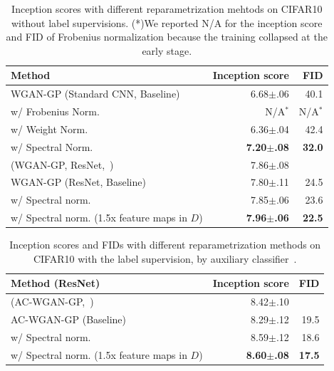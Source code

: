 \documentclass{article}
\begin{document}
\begin{table}
  \centering
  \begin{tabular}{lrr}
    \toprule
    \textbf{Method} & \textbf{Inception score} & \textbf{FID}\\
    \midrule
    WGAN-GP (Standard CNN, Baseline) & 6.68$\pm$.06 & 40.1  \\
    w/ Frobenius Norm. & N/A$^*$ & N/A$^*$ \\
    w/ Weight Norm. & 6.36$\pm$.04 & 42.4 \\
    w/ Spectral Norm. & \bf{7.20$\pm$.08} & \bf{32.0} \\
    \midrule
    (WGAN-GP, ResNet,~\cite{gulrajani2017improved}) & 7.86$\pm$.08\\
    WGAN-GP (ResNet, Baseline) & 7.80$\pm$.11 & 24.5 \\
    w/ Spectral norm. & 7.85$\pm$.06 & 23.6\\
    w/ Spectral norm. (1.5x feature maps in $D$) & \bf{7.96$\pm$.06} & \textbf{22.5} \\
    \bottomrule
  \end{tabular}
  \caption{\label{tab:wgan_gp_reparam1} Inception scores with different reparametrization mehtods on CIFAR10 without label supervisions. (*)We reported N/A for the inception score and FID of Frobenius normalization because the training collapsed at the early stage. }
\end{table}

\begin{table}
  \centering
  \begin{tabular}{lrr}
    \toprule
    \textbf{Method} (ResNet) & \textbf{Inception score} & \textbf{FID}\\
    \midrule
    (AC-WGAN-GP,~\cite{gulrajani2017improved}) & 8.42$\pm$.10 & \\
    \midrule
    AC-WGAN-GP (Baseline) & 8.29$\pm$.12 & 19.5 \\
    w/ Spectral norm. & 8.59$\pm$.12 & 18.6 \\
    w/ Spectral norm. (1.5x feature maps in $D$) & \textbf{8.60$\pm$.08} & \textbf{17.5} \\
    \bottomrule
  \end{tabular}
  \caption{\label{tab:wgan_gp_reparam2} Inception scores and FIDs with different reparametrization methods on CIFAR10 with the label supervision, by auxiliary classifier~\cite[]{odena2016conditional}. }
\end{table}
\end{document}
